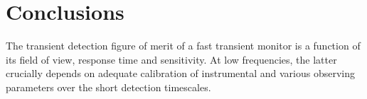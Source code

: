 \documentclass{aa}
\begin{document}




\section{Conclusions}

The  transient detection  figure  of merit  of  a fast  transient  monitor is  a
function  of  its  field  of  view,  response  time  and  sensitivity.   At  low
frequencies,   the  latter   crucially  depends   on  adequate   calibration  of
instrumental  and   various  observing  parameters  over   the  short  detection
timescales.  
\end{document}
